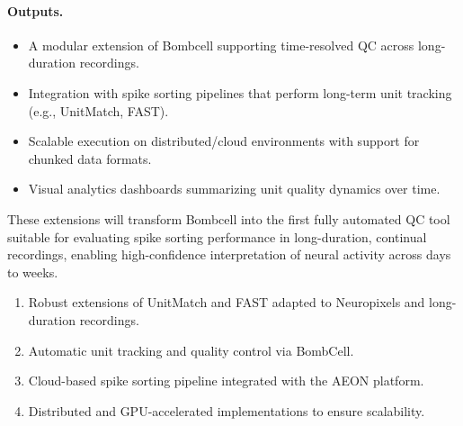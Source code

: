 \paragraph{Outputs.}
\begin{itemize}
    \item A modular extension of Bombcell supporting time-resolved QC across long-duration recordings.
    \item Integration with spike sorting pipelines that perform long-term unit tracking (e.g., UnitMatch, FAST).
    \item Scalable execution on distributed/cloud environments with support for chunked data formats.
    \item Visual analytics dashboards summarizing unit quality dynamics over time.
\end{itemize}

These extensions will transform Bombcell into the first fully automated QC tool suitable for evaluating spike sorting performance in long-duration, continual recordings, enabling high-confidence interpretation of neural activity across days to weeks.

\begin{enumerate}
    \item Robust extensions of UnitMatch and FAST adapted to Neuropixels and long-duration recordings.
    \item Automatic unit tracking and quality control via BombCell.
    \item Cloud-based spike sorting pipeline integrated with the AEON platform.
    \item Distributed and GPU-accelerated implementations to ensure scalability.
\end{enumerate}

